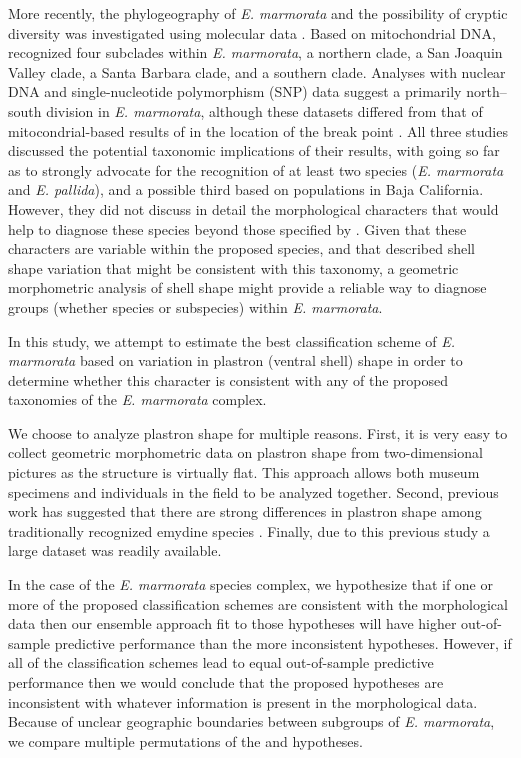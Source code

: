 \documentclass[12pt,letterpaper]{article}
\begin{document}
More recently, the phylogeography of \textit{E. marmorata} and the possibility of cryptic diversity was investigated using molecular data \citep{Spinks2005,Spinks2010,Spinks2014}. Based on mitochondrial DNA, \citet{Spinks2005} recognized four subclades within \textit{E. marmorata}, a northern clade, a San Joaquin Valley clade, a Santa Barbara clade, and a southern clade. Analyses with nuclear DNA \citep{Spinks2010} and single-nucleotide polymorphism (SNP) data suggest a primarily north--south division in \textit{E. marmorata}, although these datasets differed from that of mitocondrial-based results of \citet{Spinks2005} in the location of the break point \citep{Spinks2014}. All three studies discussed the potential taxonomic implications of their results, with \citet{Spinks2014} going so far as to strongly advocate for the recognition of at least two species (\emph{E. marmorata} and \emph{E. pallida}), and a possible third based on populations in Baja California. However, they did not discuss in detail the morphological characters that would help to diagnose these species beyond those specified by \citet{Seeliger1945}. Given that these characters are variable within the proposed species, and that \citet{Holland1992} described shell shape variation that might be consistent with this taxonomy, a geometric morphometric analysis of shell shape might provide a reliable way to diagnose groups (whether species or subspecies) within \textit{E. marmorata}.

In this study, we attempt to estimate the best classification scheme of \textit{E. marmorata} based on variation in plastron (ventral shell) shape in order to determine whether this character is consistent with any of the proposed taxonomies of the \textit{E. marmorata} complex. 

We choose to analyze plastron shape for multiple reasons. First, it is very easy to collect geometric morphometric data on plastron shape from two-dimensional pictures as the structure is virtually flat. This approach allows both museum specimens and individuals in the field to be analyzed together. Second, previous work has suggested that there are strong differences in plastron shape among traditionally recognized emydine species \citep{Angielczyk2007,Angielczyk2011,Angielczyk2013a}. Finally, due to this previous study a large dataset was readily available.

In the case of the \textit{E. marmorata} species complex, we hypothesize that if one or more of the proposed classification schemes are consistent with the morphological data then our ensemble approach fit to those hypotheses will have higher out-of-sample predictive performance than the more inconsistent hypotheses. However, if all of the classification schemes lead to equal out-of-sample predictive performance then we would conclude that the proposed hypotheses are inconsistent with whatever information is present in the morphological data. Because of unclear geographic boundaries between subgroups of \textit{E. marmorata}, we compare multiple permutations of the \citep{Spinks2010} and \citet{Spinks2014} hypotheses.
\end{document}
